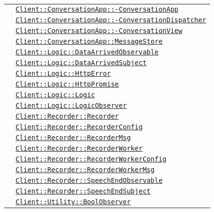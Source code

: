 \begin{longtable}{|>{\centering}m{3cm}|m{10cm}<{\centering}|}
& \hyperref[Client::ConversationApp::ConversationApp]{\texttt{Client::ConversationApp::-\linebreak ConversationApp}}\\
& \hyperref[Client::ConversationApp::ConversationDispatcher]{\texttt{Client::ConversationApp::-\linebreak ConversationDispatcher}}\\
& \hyperref[Client::ConversationApp::ConversationView]{\texttt{Client::ConversationApp::-\linebreak ConversationView}}\\
& \hyperref[Client::ConversationApp::MessageStore]{\texttt{Client::ConversationApp::MessageStore}}\\
& \hyperref[Client::Logic::DataArrivedObservable]{\texttt{Client::Logic::DataArrivedObservable}}\\
& \hyperref[Client::Logic::DataArrivedSubject]{\texttt{Client::Logic::DataArrivedSubject}}\\
& \hyperref[Client::Logic::HttpError]{\texttt{Client::Logic::HttpError}}\\
& \hyperref[Client::Logic::HttpPromise]{\texttt{Client::Logic::HttpPromise}}\\
& \hyperref[Client::Logic::Logic]{\texttt{Client::Logic::Logic}}\\
& \hyperref[Client::Logic::LogicObserver]{\texttt{Client::Logic::LogicObserver}}\\
& \hyperref[Client::Recorder::Recorder]{\texttt{Client::Recorder::Recorder}}\\
& \hyperref[Client::Recorder::RecorderConfig]{\texttt{Client::Recorder::RecorderConfig}}\\
& \hyperref[Client::Recorder::RecorderMsg]{\texttt{Client::Recorder::RecorderMsg}}\\
& \hyperref[Client::Recorder::RecorderWorker]{\texttt{Client::Recorder::RecorderWorker}}\\
& \hyperref[Client::Recorder::RecorderWorkerConfig]{\texttt{Client::Recorder::RecorderWorkerConfig}}\\
& \hyperref[Client::Recorder::RecorderWorkerMsg]{\texttt{Client::Recorder::RecorderWorkerMsg}}\\
& \hyperref[Client::Recorder::SpeechEndObservable]{\texttt{Client::Recorder::SpeechEndObservable}}\\
& \hyperref[Client::Recorder::SpeechEndSubject]{\texttt{Client::Recorder::SpeechEndSubject}}\\
& \hyperref[Client::Utility::BoolObserver]{\texttt{Client::Utility::BoolObserver}}\\

\end{longtable}
